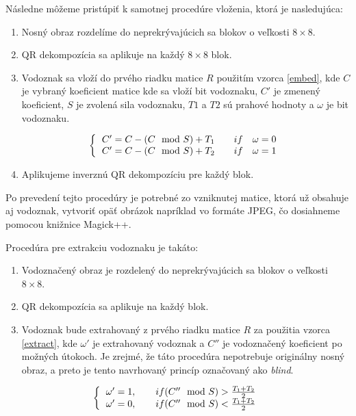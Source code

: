 Následne môžeme pristúpiť k samotnej procedúre vloženia, ktorá je nasledujúca:
\begin{enumerate}
\item Nosný obraz rozdelíme do neprekrývajúcich sa blokov o veľkosti $8\times8$.
\item QR dekompozícia sa aplikuje na každý $8\times8$ blok.
\item Vodoznak sa vloží do prvého riadku matice $R$ použitím vzorca \ref{embed}, kde $C$ je vybraný koeficient matice kde sa vloží bit vodoznaku, $C'$ je zmenený koeficient, $S$ je zvolená sila vodoznaku, $T1$ a $T2$ sú prahové hodnoty a $\omega$ je bit vodoznaku.

\begin{equation} \label{embed}
\left \{
  \begin{tabular}{c}
  $C' = C - (C\mod S) + T_1 \qquad if \quad \omega = 0$ \\
  $C' = C - (C\mod S) + T_2 \qquad if \quad \omega = 1$
  \end{tabular}
\right.
\end{equation}
\item Aplikujeme inverznú QR dekompozíciu pre každý blok.
\end{enumerate}

Po prevedení tejto procedúry je potrebné zo vzniknutej matice, ktorá už obsahuje aj vodoznak, vytvoriť opäť obrázok napríklad vo formáte JPEG, čo dosiahneme pomocou knižnice Magick++.

Procedúra pre extrakciu vodoznaku je takáto:
\begin{enumerate}
\item Vodoznačený obraz je rozdelený do neprekrývajúcich sa blokov o veľkosti $8\times8$.
\item QR dekompozícia sa aplikuje na každý blok.
\item Vodoznak bude extrahovaný z prvého riadku matice $R$ za použitia vzorca \ref{extract}, kde $\omega'$ je extrahovaný vodoznak a $C''$ je vodoznačený koeficient po možných útokoch. Je zrejmé, že táto procedúra nepotrebuje originálny nosný obraz, a preto je tento navrhovaný princíp označovaný ako {\it blind}.
\end{enumerate}

\begin{equation} \label{extract}
\left \{
  \begin{tabular}{c}
  $\omega' = 1,\qquad if (C''\mod S) > \frac{T_1+T_2}{2}$ \\
  $\omega' = 0,\qquad if (C''\mod S) < \frac{T_1+T_2}{2}$
  \end{tabular}
\right.
\end{equation}



